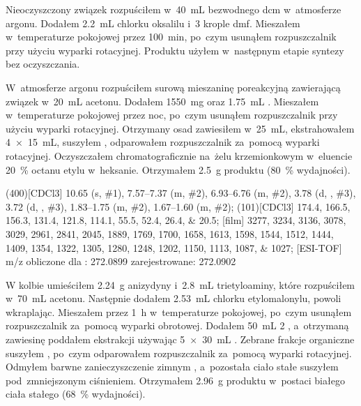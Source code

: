 Nieoczyszczony związek  rozpuściłem w~\SI{40}{\mL}
  bezwodnego \gls{dcm} w~atmosferze argonu. Dodałem \SI{2.2}{\mL} chlorku oksalilu
  i~\num{3} krople \gls{dmf}.
Mieszałem w~temperaturze pokojowej przez \SI{100}{\minute}, po~czym usunąłem rozpuszczalnik
  przy użyciu wyparki rotacyjnej.
Produktu użyłem w~następnym etapie syntezy bez oczyszczania.

W~atmosferze argonu rozpuściłem surową mieszaninę poreakcyjną zawierającą związek
   w~\SI{20}{\mL} acetonu.
Dodałem \SI{1550}{\milli\gram}  oraz \SI{1.75}{\mL} .
Mieszałem w~temperaturze pokojowej przez noc, po~czym usunąłem rozpuszczalnik przy użyciu
  wyparki rotacyjnej.
Otrzymany osad zawiesiłem w~\SI{25}{\mL},
  ekstrahowałem \SI[product-units = single]{4 x 15}{\mL},
  suszyłem , odparowałem rozpuszczalnik za~pomocą wyparki rotacyjnej.
Oczyszczałem chromatograficznie na~żelu krzemionkowym w~eluencie \SI{20}{\percent} octanu
  etylu w~heksanie.
Otrzymałem \SI{2.5}{\gram} produktu (\SI{80}{\percent} wydajności).

\begin{fullexp}
  \NMR(400)[CDCl3] \num{10.65} (s, \#{1}), \numrange{7.57}{7.37} (m, \#{2}), \numrange{6.93}{6.76} (m, \#{2}), \num{3.78} (d, , \#{3}), \num{3.72} (d, , \#{3}), \numrange{1.83}{1.75} (m, \#{2}), \numrange{1.67}{1.60} (m, \#{2});
  (101)[CDCl3] \numlist{174.4; 166.5; 156.3; 131.4; 121.8; 114.1; 55.5; 52.4; 26.4; 20.5};
  [film] \numlist{3277; 3234; 3136; 3078; 3029; 2961; 2841; 2045; 1889; 1769; 1700; 1658; 1613; 1598; 1544; 1512; 1444; 1409; 1354; 1322; 1305; 1280; 1248; 1202; 1150; 1113; 1087; 1027};
  [ESI-TOF] m/z obliczone dla : \num{272.0899} zarejestrowane: \num{272.0902}
\end{fullexp}

W kolbie umieściłem \SI{2.24}{\gram} anizydyny i~\SI{2.8}{\mL} trietyloaminy,
  które rozpuściłem w~\SI{70}{\mL} acetonu.
Następnie dodałem \SI{2.53}{\mL} chlorku etylomalonylu, powoli wkraplając.
Mieszałem przez \SI{1}{\hour} w~temperaturze pokojowej, po~czym usunąłem rozpuszczalnik
  za~pomocą wyparki obrotowej.
Dodałem \SI{50}{\mL} \SI{2}{\Molar} , a~otrzymaną zawiesinę poddałem ekstrakcji
  używając \SI[product-units = single]{5 x 30}{\mL} .
Zebrane frakcje organiczne suszyłem , po~czym odparowałem rozpuszczalnik za~pomocą
  wyparki rotacyjnej.
Odmyłem barwne zanieczyszczenie zimnym ,
  a~pozostała ciało stałe suszyłem pod~zmniejszonym ciśnieniem.
Otrzymałem \SI{2.96}{\gram} produktu w~postaci białego ciała stałego (\SI{68}{\percent} wydajności).

